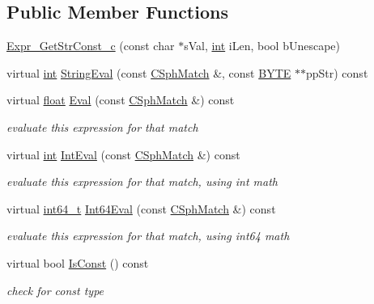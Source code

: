 \subsection*{Public Member Functions}
\begin{DoxyCompactItemize}
\item 
\hyperlink{structExpr__GetStrConst__c_a7396267312c645694af48ba3fa6aa690}{Expr\-\_\-\-Get\-Str\-Const\-\_\-c} (const char $\ast$s\-Val, \hyperlink{sphinxexpr_8cpp_a4a26e8f9cb8b736e0c4cbf4d16de985e}{int} i\-Len, bool b\-Unescape)
\item 
virtual \hyperlink{sphinxexpr_8cpp_a4a26e8f9cb8b736e0c4cbf4d16de985e}{int} \hyperlink{structExpr__GetStrConst__c_ac0ea11de29218a4e2e9edf05c69bd840}{String\-Eval} (const \hyperlink{classCSphMatch}{C\-Sph\-Match} \&, const \hyperlink{sphinxstd_8h_a4ae1dab0fb4b072a66584546209e7d58}{B\-Y\-T\-E} $\ast$$\ast$pp\-Str) const 
\item 
virtual \hyperlink{sphinxexpr_8cpp_a0e0d0739f7035f18f949c2db2c6759ec}{float} \hyperlink{structExpr__GetStrConst__c_a55c529e232f4a19472604d2f34dd99aa}{Eval} (const \hyperlink{classCSphMatch}{C\-Sph\-Match} \&) const 
\begin{DoxyCompactList}\small\item\em evaluate this expression for that match \end{DoxyCompactList}\item 
virtual \hyperlink{sphinxexpr_8cpp_a4a26e8f9cb8b736e0c4cbf4d16de985e}{int} \hyperlink{structExpr__GetStrConst__c_a872aa1e5fd7d3b003144e38f7acf3e28}{Int\-Eval} (const \hyperlink{classCSphMatch}{C\-Sph\-Match} \&) const 
\begin{DoxyCompactList}\small\item\em evaluate this expression for that match, using int math \end{DoxyCompactList}\item 
virtual \hyperlink{sphinxstd_8h_a996e72f71b11a5bb8b3b7b6936b1516d}{int64\-\_\-t} \hyperlink{structExpr__GetStrConst__c_a4f98502fcf34f6de5ff99e541115fba1}{Int64\-Eval} (const \hyperlink{classCSphMatch}{C\-Sph\-Match} \&) const 
\begin{DoxyCompactList}\small\item\em evaluate this expression for that match, using int64 math \end{DoxyCompactList}\item 
virtual bool \hyperlink{structExpr__GetStrConst__c_a5248cfbe82c8bcdbdafa83f46234f8e8}{Is\-Const} () const 
\begin{DoxyCompactList}\small\item\em check for const type \end{DoxyCompactList}\item 
$$
\end{DoxyCompactItemize}

